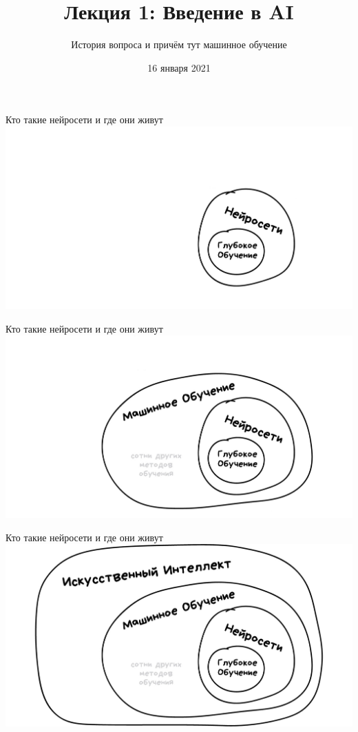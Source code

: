 \documentclass[aspectratio=169]{beamer}
\title{Лекция 1: Введение в AI}
\subtitle{История вопроса и причём тут машинное обучение}
\date{16 января 2021}
\begin{document}
\maketitle

\begin{frame}{Кто такие нейросети и где они живут}
    \centering
    \includegraphics[width=.9\linewidth]{graphs/fig1_0.jpg}
\end{frame}

\begin{frame}{Кто такие нейросети и где они живут}
    \centering
    \includegraphics[width=.9\linewidth]{graphs/fig1_1.jpg}
\end{frame}

\begin{frame}{Кто такие нейросети и где они живут}
    \centering
    \includegraphics[width=.9\linewidth]{graphs/fig1_2.jpg}
\end{frame}
\end{document}
